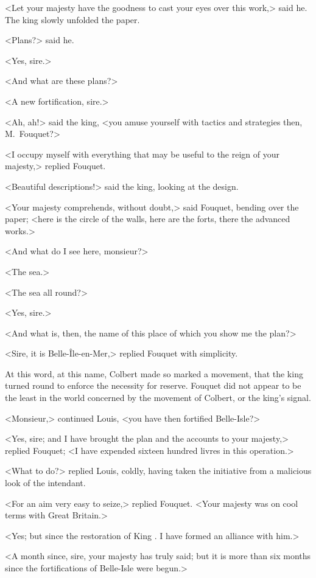 <Let your majesty have the goodness to cast your eyes over this work,> said he. The king slowly unfolded the paper.

<Plans?> said he.

<Yes, sire.>

<And what are these plans?>

<A new fortification, sire.>

<Ah, ah!> said the king, <you amuse yourself with tactics and strategies then, M.~Fouquet?>

<I occupy myself with everything that may be useful to the reign of your majesty,> replied Fouquet.

<Beautiful descriptions!> said the king, looking at the design.

<Your majesty comprehends, without doubt,> said Fouquet, bending over the paper; <here is the circle of the walls, here are the forts, there the advanced works.>

<And what do I see here, monsieur?>

<The sea.>

<The sea all round?>

<Yes, sire.>

<And what is, then, the name of this place of which you show me the plan?>

<Sire, it is Belle-Île-en-Mer,> replied Fouquet with simplicity.

At this word, at this name, Colbert made so marked a movement, that the king turned round to enforce the necessity for reserve. Fouquet did not appear to be the least in the world concerned by the movement of Colbert, or the king's signal.

<Monsieur,> continued Louis, <you have then fortified Belle-Isle?>

<Yes, sire; and I have brought the plan and the accounts to your majesty,> replied Fouquet; <I have expended sixteen hundred livres in this operation.>

<What to do?> replied Louis, coldly, having taken the initiative from a malicious look of the intendant.

<For an aim very easy to seize,> replied Fouquet. <Your majesty was on cool terms with Great Britain.>

<Yes; but since the restoration of King . I have formed an alliance with him.>

<A month since, sire, your majesty has truly said; but it is more than six months since the fortifications of Belle-Isle were begun.>

